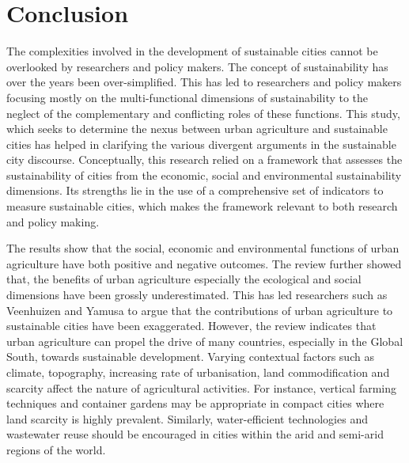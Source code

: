 \chapter{Conclusion} %

\label{Chapter:Conclusion}

The complexities involved in the development of sustainable cities cannot be overlooked by researchers and policy makers. The concept of sustainability has over the years been over-simplified. This has led to researchers and policy makers focusing mostly on the multi-functional dimensions of sustainability to the neglect of the complementary and conflicting roles of these functions. This study, which seeks to determine the nexus between urban agriculture and sustainable cities has helped in clarifying the various divergent arguments in the sustainable city discourse. Conceptually, this research relied on a framework that assesses the sustainability of cities from the economic, social and environmental sustainability dimensions. Its strengths lie in the use of a comprehensive set of indicators to measure sustainable cities, which makes the framework relevant to both research and policy making.

The results show that the social, economic and environmental functions of urban agriculture have both positive and negative outcomes. The review further showed that, the benefits of urban agriculture especially the ecological and social dimensions have been grossly underestimated. This has led researchers such as Veenhuizen \cite{Veenhuizen} and Yamusa \cite{Agbenyour2014} to argue that the contributions of urban agriculture to sustainable cities have been exaggerated. However, the review indicates that urban agriculture can propel the drive of many countries, especially in the Global South, towards sustainable development. Varying contextual factors such as climate, topography, increasing rate of urbanisation, land commodification and scarcity affect the nature of agricultural activities. For instance, vertical farming techniques and container gardens may be appropriate in compact cities where land scarcity is highly prevalent. Similarly, water-efficient technologies and wastewater reuse should be encouraged in cities within the arid and semi-arid regions of the world.

